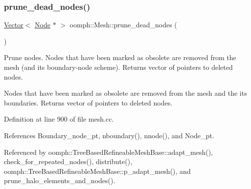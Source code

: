 \mbox{\label{classoomph_1_1Mesh_ac9f58929371a3f39dd646d2756547ad2}} 
\subsubsection{\texorpdfstring{prune\+\_\+dead\+\_\+nodes()}{prune\_dead\_nodes()}}
{\footnotesize\ttfamily \hyperlink{classoomph_1_1Vector}{Vector}$<$ \hyperlink{classoomph_1_1Node}{Node} $\ast$ $>$ oomph\+::\+Mesh\+::prune\+\_\+dead\+\_\+nodes (\begin{DoxyParamCaption}{ }\end{DoxyParamCaption})}



Prune nodes. Nodes that have been marked as obsolete are removed from the mesh (and its boundary-\/node scheme). Returns vector of pointers to deleted nodes. 

Nodes that have been marked as obsolete are removed from the mesh and the its boundaries. Returns vector of pointers to deleted nodes. 

Definition at line 900 of file mesh.\+cc.



References Boundary\+\_\+node\+\_\+pt, nboundary(), nnode(), and Node\+\_\+pt.



Referenced by oomph\+::\+Tree\+Based\+Refineable\+Mesh\+Base\+::adapt\+\_\+mesh(), check\+\_\+for\+\_\+repeated\+\_\+nodes(), distribute(), oomph\+::\+Tree\+Based\+Refineable\+Mesh\+Base\+::p\+\_\+adapt\+\_\+mesh(), and prune\+\_\+halo\+\_\+elements\+\_\+and\+\_\+nodes().

\mbox{\label{classoomph_1_1Mesh_a58bec30bd9679b92a74e0355f460b421}} 
